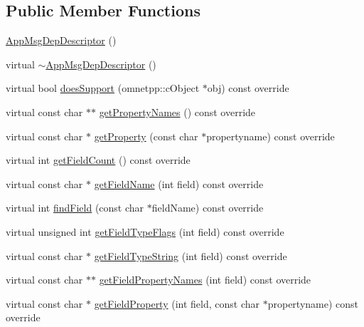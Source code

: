 \subsection*{Public Member Functions}
\begin{DoxyCompactItemize}
\item 
\hyperlink{class_app_msg_dep_descriptor_a9e34bc0dc8c5ebf87d3861c741a1ee78}{App\+Msg\+Dep\+Descriptor} ()
\item 
virtual \hyperlink{class_app_msg_dep_descriptor_aef6f0e8734bc696c3e76065a642ae84e}{$\sim$\+App\+Msg\+Dep\+Descriptor} ()
\item 
virtual bool \hyperlink{class_app_msg_dep_descriptor_ab9ca1804536d49681d6e681f97627c92}{does\+Support} (omnetpp\+::c\+Object $\ast$obj) const override
\item 
virtual const char $\ast$$\ast$ \hyperlink{class_app_msg_dep_descriptor_a52285a3c2457062bf24e71a1b68e266d}{get\+Property\+Names} () const override
\item 
virtual const char $\ast$ \hyperlink{class_app_msg_dep_descriptor_a35837c5cdbb09afde09b6cc89618899e}{get\+Property} (const char $\ast$propertyname) const override
\item 
virtual int \hyperlink{class_app_msg_dep_descriptor_ad204cc9df6c39c659db4382d44bb5138}{get\+Field\+Count} () const override
\item 
virtual const char $\ast$ \hyperlink{class_app_msg_dep_descriptor_abc7c71b322dd44e9e013d796a1847f98}{get\+Field\+Name} (int field) const override
\item 
virtual int \hyperlink{class_app_msg_dep_descriptor_aa3197b479875191ad8c565907640832f}{find\+Field} (const char $\ast$field\+Name) const override
\item 
virtual unsigned int \hyperlink{class_app_msg_dep_descriptor_a14d73b922bf64e60d2401cc2f42acc32}{get\+Field\+Type\+Flags} (int field) const override
\item 
virtual const char $\ast$ \hyperlink{class_app_msg_dep_descriptor_a376972c07aabb5b32e12a38649a56aaf}{get\+Field\+Type\+String} (int field) const override
\item 
virtual const char $\ast$$\ast$ \hyperlink{class_app_msg_dep_descriptor_a2b0c9bca08ff82a4d8bcedf97376a930}{get\+Field\+Property\+Names} (int field) const override
\item 
virtual const char $\ast$ \hyperlink{class_app_msg_dep_descriptor_a5924764c36dbe1f3af75201a843649b6}{get\+Field\+Property} (int field, const char $\ast$propertyname) const override
\item 

\end{DoxyCompactItemize}
